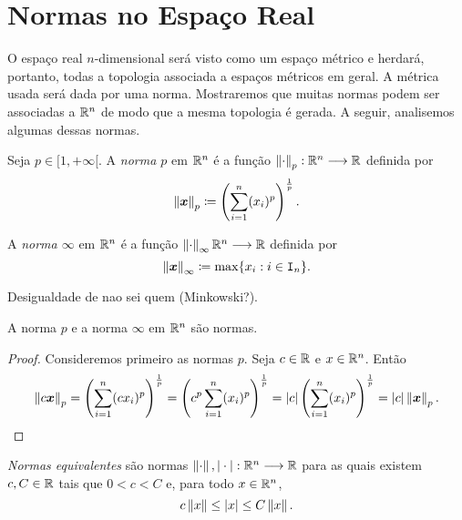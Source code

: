 \section{Normas no Espaço Real}

	O espaço real $n$-dimensional será visto como um espaço métrico e herdará, portanto, todas a topologia associada a espaços métricos em geral. A métrica usada será dada por uma norma. Mostraremos que muitas normas podem ser associadas a $\mathbb{R}^n$ de modo que a mesma topologia é gerada. A seguir, analisemos algumas dessas normas.
	
\begin{defi}
	Seja $p \in [1,+\infty[$. A \emph{norma $p$} em $\mathbb{R}^n$ é a função $\left\Vert{\cdot}\right\Vert_p: \mathbb{R}^n \longrightarrow \mathbb{R}$ definida por
	\begin{equation*}
	\nor{\bm x}_p \coloneqq \left( \sum_{i=1}^n (x_i)^p \right)^{\frac{1}{p}}.
	\end{equation*}
	
	A \emph{norma $\infty$} em $\mathbb{R}^n$ é a função $\left\Vert{\cdot}\right\Vert_\infty \mathbb{R}^n \longrightarrow \mathbb{R}$ definida por
	\begin{equation*}
	\nor{\bm x}_\infty \coloneqq \max \{x_i : i \in \inte_n \}.
	\end{equation*}
\end{defi}

\begin{prop}
	Desigualdade de nao sei quem (Minkowski?).
\end{prop}


\begin{prop}
	A norma $p$ e a norma $\infty$ em $\mathbb{R}^n$ são normas.
\end{prop}
\begin{proof}
	Consideremos primeiro as normas $p$. Seja $c \in \mathbb{R}$ e $x \in \mathbb{R}^n$. Então
	\begin{equation*}
	\left\Vert{c\bm x}\right\Vert_p = \left( \sum_{i=1}^n (cx_i)^p \right)^{\frac{1}{p}} = \left(c^p \sum_{i=1}^n (x_i)^p \right)^{\frac{1}{p}} = |c| \left( \sum_{i=1}^n (x_i)^p \right)^{\frac{1}{p}} = |c|\left\Vert{\bm x}\right\Vert_p .
	\end{equation*}
	
\end{proof}


\begin{defi}
	\emph{Normas equivalentes} são normas $\left\Vert{\cdot}\right\Vert, |\cdot|: \mathbb{R}^n \longrightarrow \mathbb{R}$ para as quais existem $c,C \in \mathbb{R}$ tais que $0 < c < C$ e, para todo $x \in \mathbb{R}^n$,
	\begin{equation*}
	c \left\Vert{x}\right\Vert \leq |x| \leq C \left\Vert{x}\right\Vert.
	\end{equation*}
\end{defi}

